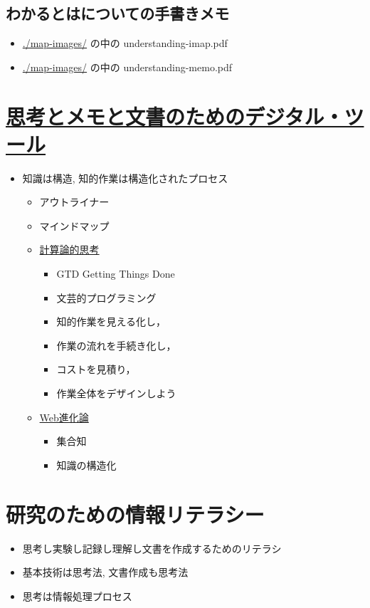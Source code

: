 \documentclass[dvipdfmx,11pat]{jarticle}
\begin{document}
\subsection{わかるとはについての手書きメモ}
\label{sec:org62bd302}
\begin{itemize}
\item \url{./map-images/} の中の understanding-imap.pdf
\item \url{./map-images/} の中の understanding-memo.pdf
\end{itemize}
\section{\href{./digital\_tools.org}{思考とメモと文書のためのデジタル・ツール}}
\label{sec:org9537c6e}
\begin{itemize}
\item 知識は構造, 知的作業は構造化されたプロセス
\begin{itemize}
\item アウトライナー
\item マインドマップ
\end{itemize}

\begin{itemize}
\item \href{./org/comp\_thinking.org}{計算論的思考}
\begin{itemize}
\item GTD Getting Things Done
\item 文芸的プログラミング
\item 知的作業を見える化し，
\item 作業の流れを手続き化し，
\item コストを見積り，
\item 作業全体をデザインしよう
\end{itemize}

\item \href{./web.org}{Web進化論}
\begin{itemize}
\item 集合知
\item 知識の構造化
\end{itemize}
\end{itemize}
\end{itemize}
\section{研究のための情報リテラシー}
\label{sec:orgfdf26dc}
\begin{itemize}
\item 思考し実験し記録し理解し文書を作成するためのリテラシ
\item 基本技術は思考法, 文書作成も思考法
\item 思考は情報処理プロセス
\end{itemize}
\end{document}

